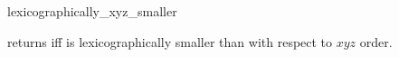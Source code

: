 \begin{ccRefFunction}{lexicographically_xyz_smaller}

{returns  iff  is lexicographically smaller
than  with respect to $xyz$ order.}

\ccSeeAlso
{} \\
 \\

\end{ccRefFunction}

